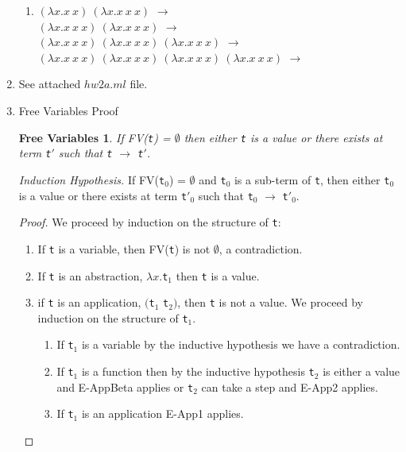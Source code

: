 \documentclass{article}
\newtheorem{free}{Free Variables}
\begin{document}
\begin{enumerate}
\begin{enumerate}
    \item $(\lambda x.x\ x)\ (\lambda x.x\ x\ x)$ $\longrightarrow$ \\
      $(\lambda x.x\ x\ x)\ (\lambda x.x\ x\ x)$ $\longrightarrow$ \\
      $(\lambda x.x\ x\ x)\ (\lambda x.x\ x\ x)\ (\lambda x.x\ x\ x)$
      $\longrightarrow$ \\
      $(\lambda x.x\ x\ x)\ (\lambda x.x\ x\ x)\ (\lambda x.x\ x\ x)\ (\lambda x.x\ x\ x)$ $\longrightarrow$ \bot


    \end{enumerate}

  \item{See attached $hw2a.ml$ file.}

  \item{Free Variables Proof}
    \begin{free}
      If FV(\verb|t|) = $\emptyset$ then either \verb|t| is a value or there exists at term \verb|t|$'$ such that \verb|t| $\longrightarrow$ \verb|t|$'$.
    \end{free}

    \textit{Induction Hypothesis.} If FV(\verb|t|$_0$) = $\emptyset$ and \verb|t|$_0$ is a sub-term of \verb|t|, then either \verb|t|$_0$ is a value or there exists at term \verb|t|$'_0$ such that \verb|t|$_0$ $\longrightarrow$ \verb|t|$'_0$.


    \begin{proof}
      We proceed by induction on the structure of \verb|t|:
      \begin{enumerate}
      \item If \verb|t| is a variable, then FV(\verb|t|) is not $\emptyset$, a contradiction.
      \item If \verb|t| is an abstraction, $\lambda x.$\verb|t|$_1$ then \verb|t| is a value.
      \item if \verb|t| is an application, $($\verb|t|$_1$ \verb|t|$_2)$, then \verb|t| is not a value. We proceed by induction on the structure of \verb|t|$_1$.
        \begin{enumerate}
        \item If \verb|t|$_1$ is a variable by the inductive hypothesis we have a contradiction.
        \item If \verb|t|$_1$ is a function then by the inductive hypothesis \verb|t|$_2$ is either a value and E-AppBeta applies or \verb|t|$_2$ can take a step and E-App2 applies.
        \item If \verb|t|$_1$ is an application E-App1 applies.
        \end{enumerate}
      \end{enumerate}
    \end{proof}


\end{enumerate}
\end{document}
